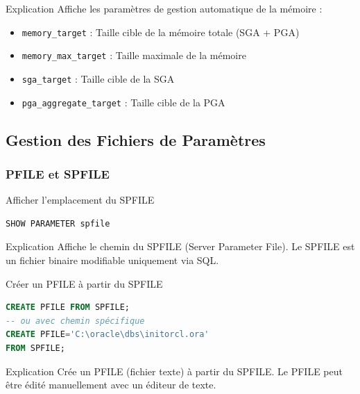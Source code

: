 \documentclass[12pt,a4paper]{article}
\begin{document}
\begin{explication}{Explication}
Affiche les paramètres de gestion automatique de la mémoire :
\begin{itemize}
    \item \texttt{memory\_target} : Taille cible de la mémoire totale (SGA + PGA)
    \item \texttt{memory\_max\_target} : Taille maximale de la mémoire
    \item \texttt{sga\_target} : Taille cible de la SGA
    \item \texttt{pga\_aggregate\_target} : Taille cible de la PGA
\end{itemize}
\end{explication}

\subsection{Gestion des Fichiers de Paramètres}

\subsubsection{PFILE et SPFILE}

\begin{commande}{Afficher l'emplacement du SPFILE}
\begin{lstlisting}[language=SQL]
SHOW PARAMETER spfile
\end{lstlisting}
\end{commande}

\begin{explication}{Explication}
Affiche le chemin du SPFILE (Server Parameter File). Le SPFILE est un fichier binaire modifiable uniquement via SQL.
\end{explication}

\begin{commande}{Créer un PFILE à partir du SPFILE}
\begin{lstlisting}[language=SQL]
CREATE PFILE FROM SPFILE;
-- ou avec chemin spécifique
CREATE PFILE='C:\oracle\dbs\initorcl.ora' 
FROM SPFILE;
\end{lstlisting}
\end{commande}

\begin{explication}{Explication}
Crée un PFILE (fichier texte) à partir du SPFILE. Le PFILE peut être édité manuellement avec un éditeur de texte.
\end{explication}
\end{document}
